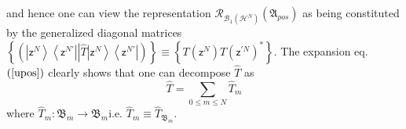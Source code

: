 \documentclass[aps,preprint]{revtex4}%
\begin{document}
and hence one can view the representation $\mathcal{R}_{\mathcal{B}_{1}\left(
\mathcal{H}^{N}\right)  }\left(  \mathfrak{A}_{pos}\right)  $ as being
constituted by the generalized diagonal matrices $\left\{  \left(  \left\vert
\mathsf{z}^{N}\right\rangle \left\langle \mathsf{z}^{N\prime}\right\vert
\left\vert \hat{T}\right.  \left\vert \mathsf{z}^{N}\right\rangle \left\langle
\mathsf{z}^{N\prime}\right\vert \right)  \right\}  \equiv\left\{  T\left(
\mathsf{z}^{N}\right)  T\left(  \mathsf{z}^{\prime N}\right)  ^{\ast}\right\}
$. The expansion eq. $\left(  \ref{upos}\right)  $ clearly shows that one can
decompose $\hat{T}$ as
\begin{equation}
\hat{T}=%
{\displaystyle\sum\limits_{0\leq m\leq N}}
\hat{T}_{m}%
\end{equation}
where $\hat{T}_{m}:\mathfrak{B}_{m}\rightarrow\mathfrak{B}_{m}$i.e. $\hat
{T}_{m}\equiv\hat{T}_{\mathfrak{B}_{m}}$.
\end{document}
